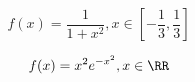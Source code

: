 \begin{minipage}[t]{0.49\textwidth}
    \begin{subtask}
        \[f(x)=\frac{1}{1+x^2}, x\in[-\frac{1}{3}, \frac{1}{3}]\]
    \end{subtask}
    \begin{solution}
        
    \end{solution}
\end{minipage} %
\begin{minipage}[t]{0.49\textwidth}
    \begin{subtask}
        \[f(x)=x^2e^{-x^2}, x\in\RR\]
    \end{subtask}
    \begin{solution}
        
    \end{solution}
\end{minipage}